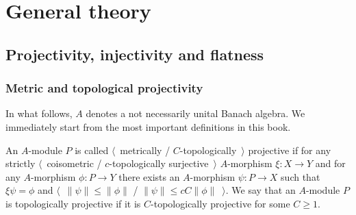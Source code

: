
\chapter{General theory}\label{ChapterGeneralTheory} 



\section{
    Projectivity, injectivity and flatness}\label{SectionProjectivityInjectivityAndFlatness}



\subsection{
    Metric and topological projectivity}\label{SubSectionMetricAndTopologicalProjectivity}

In what follows, $A$ denotes a not necessarily unital Banach algebra. We
immediately start from the most important definitions in this book.

\begin{definition}\label{MetCTopProjMod} 
An $A$-module $P$ is 
called $\langle$~metrically / $C$-topologically~$\rangle$ projective if for any 
strictly $\langle$~coisometric / $c$-topologically surjective~$\rangle$
$A$-morphism $\xi:X\to Y$ and for any $A$-morphism $\phi:P\to Y$ 
there exists an $A$-morphism $\psi:P\to X$ such that $\xi\psi=\phi$  and
$\langle$~$\lVert\psi\rVert\leq\lVert\phi\rVert$ / 
$\lVert \psi\rVert\leq c C\lVert\phi\rVert$~$\rangle$. We say that an $A$-module 
$P$ is topologically projective if it is $C$-topologically projective for 
some $C\geq 1$.
\end{definition}

